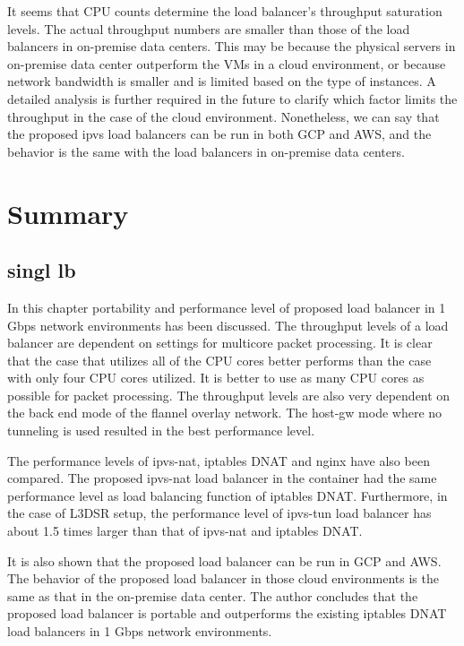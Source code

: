 It seems that CPU counts determine the load balancer's throughput saturation levels.
The actual throughput numbers are smaller than those of the load balancers in on-premise data centers.
This may be because the physical servers in on-premise data center outperform the VMs in a cloud environment, or because network bandwidth is smaller and is limited based on the type of instances.
A detailed analysis is further required in the future to clarify which factor limits the throughput in the case of the cloud environment.
Nonetheless, we can say that the proposed ipvs load balancers can be run in both GCP and AWS, and the behavior is the same with the load balancers in on-premise data centers.


\FloatBarrier

\section{Summary}

\subsection{singl lb}

In this chapter portability and performance level of proposed load balancer in 1 Gbps network environments has been discussed.
The throughput levels of a load balancer are dependent on settings for multicore packet processing.
It is clear that the case that utilizes all of the CPU cores better performs than the case with only four CPU cores utilized.
It is better to use as many CPU cores as possible for packet processing.
The throughput levels are also very dependent on the back end mode of the flannel overlay network.
The host-gw mode where no tunneling is used resulted in the best performance level.

The performance levels of ipvs-nat, iptables DNAT and nginx have also been compared.
The proposed ipvs-nat load balancer in the container had the same performance level as load balancing function of iptables DNAT.
Furthermore, in the case of L3DSR setup, the performance level of ipvs-tun load balancer has about 1.5 times larger than that of ipvs-nat and iptables DNAT.

It is also shown that the proposed load balancer can be run in GCP and AWS.
The behavior of the proposed load balancer in those cloud environments is the same as that in the on-premise data center.
The author concludes that the proposed load balancer is portable and outperforms the existing iptables DNAT load balancers in 1 Gbps network environments.


